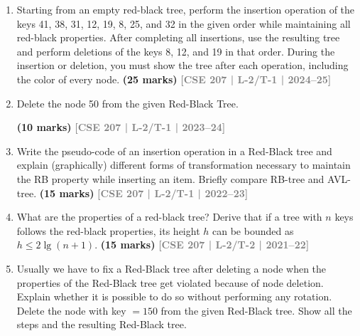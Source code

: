 \documentclass[12pt]{article}
\newcommand{\yr}[1]{\hfill\textcolor{gray}{\small\textbf{[#1]}}}
\newcommand{\mk}[1]{\textcolor{orange!70!black}{\small\textbf{(#1 marks)}}}
\begin{document}
\begin{enumerate}

\item Starting from an empty red-black tree, perform the insertion operation of the keys 41, 38, 31, 12, 19, 8, 25, and 32 in the given order while maintaining all red-black properties. After completing all insertions, use the resulting tree and perform deletions of the keys 8, 12, and 19 in that order. During the insertion or deletion, you must show the tree after each operation, including the color of every node.
\mk{25} \yr{CSE 207 | L-2/T-1 | 2024--25}


\item Delete the node 50 from the given Red-Black Tree.
\begin{center}
\end{center}
\mk{10} \yr{CSE 207 | L-2/T-1 | 2023--24}


\item Write the pseudo-code of an insertion operation in a Red-Black tree and explain (graphically) different forms of transformation necessary to maintain the RB property while inserting an item. Briefly compare RB-tree and AVL-tree.
\mk{15} \yr{CSE 207 | L-2/T-1 | 2022--23}


\item What are the properties of a red-black tree? Derive that if a tree with $n$ keys follows the red-black properties, its height $h$ can be bounded as $h \leq 2\lg(n + 1)$.
\mk{15} \yr{CSE 207 | L-2/T-2 | 2021--22}


\item Usually we have to fix a Red-Black tree after deleting a node when the properties of the Red-Black tree get violated because of node deletion. Explain whether it is possible to do so without performing any rotation. Delete the node with key $= 150$ from the given Red-Black tree. Show all the steps and the resulting Red-Black tree.
\begin{center}
\begin{tikzpicture}[
  scale=0.85, transform shape,
  every node/.style={circle, draw=black, thick, font=\bfseries\small, inner sep=0pt, minimum size=0.75cm},
  red node/.style={fill=red, text=white, draw=red!80!black},
  black node/.style={fill=black, text=white, draw=black},
  nil leaf/.style={rectangle, fill=black, draw=black, minimum size=0.35cm, inner sep=0pt},
  edge/.style={thick, black}
]


\end{tikzpicture}
\end{center}
\end{enumerate}
\end{document}
